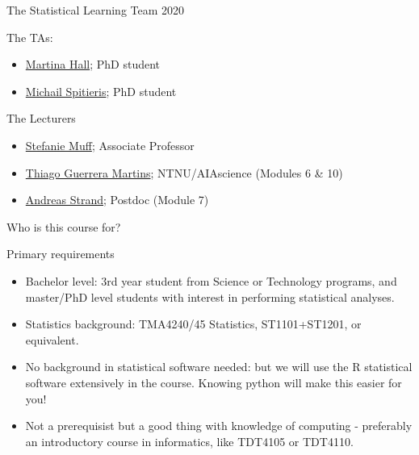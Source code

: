 \documentclass[10pt,ignorenonframetext,]{beamer}
\providecommand{\tightlist}{%
  \setlength{\itemsep}{0pt}\setlength{\parskip}{0pt}}
\begin{document}
\begin{frame}{The Statistical Learning Team 2020}

\begin{block}{The TAs:}

\begin{itemize}
\tightlist
\item
  \href{https://www.ntnu.no/ansatte/martina.hall}{Martina Hall}; PhD
  student
\item
  \href{https://www.ntnu.no/ansatte/michail.spitieris}{Michail
  Spitieris}; PhD student
\end{itemize}

\end{block}

\begin{block}{The Lecturers}

\begin{itemize}
\tightlist
\item
  \href{https://www.ntnu.edu/employees/stefanie.muff}{Stefanie Muff};
  Associate Professor
\item
  \href{https://www.ntnu.no/ansatte/thiago.guerrera}{Thiago Guerrera
  Martins}; NTNU/AIAscience (Modules 6 \& 10)
\item
  \href{https://www.ntnu.no/ansatte/andreas.strand}{Andreas Strand};
  Postdoc (Module 7)
\end{itemize}

\end{block}

\end{frame}

\begin{frame}{Who is this course for?}

\begin{block}{Primary requirements}

\begin{itemize}
\item
  Bachelor level: 3rd year student from Science or Technology programs,
  and master/PhD level students with interest in performing statistical
  analyses.
\item
  Statistics background: TMA4240/45 Statistics, ST1101+ST1201, or
  equivalent.
\item
  No background in statistical software needed: but we will use the R
  statistical software extensively in the course. Knowing python will
  make this easier for you!
\item
  Not a prerequisist but a good thing with knowledge of computing -
  preferably an introductory course in informatics, like TDT4105 or
  TDT4110.
\end{itemize}

\end{block}

\end{frame}
\end{document}
